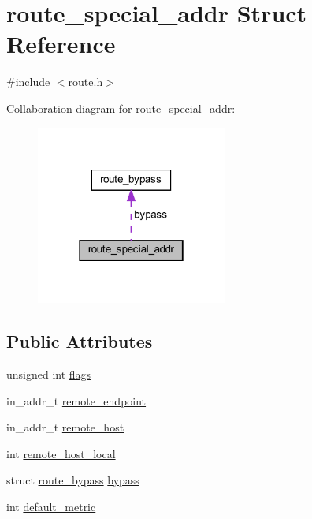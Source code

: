 \hypertarget{structroute__special__addr}{}\section{route\+\_\+special\+\_\+addr Struct Reference}
\label{structroute__special__addr}


{\ttfamily \#include $<$route.\+h$>$}



Collaboration diagram for route\+\_\+special\+\_\+addr\+:
\nopagebreak
\begin{figure}[H]
\begin{center}
\leavevmode
\includegraphics[width=178pt]{structroute__special__addr__coll__graph}
\end{center}
\end{figure}
\subsection*{Public Attributes}
\begin{DoxyCompactItemize}
\item 
unsigned int \hyperlink{structroute__special__addr_a481f8fbd69fd0bde3bc759962a694b3a}{flags}
\item 
in\+\_\+addr\+\_\+t \hyperlink{structroute__special__addr_aefc0db034c6d31840081075e4ee62098}{remote\+\_\+endpoint}
\item 
in\+\_\+addr\+\_\+t \hyperlink{structroute__special__addr_a38a9460b7b2499bb5fd58215639ae59d}{remote\+\_\+host}
\item 
int \hyperlink{structroute__special__addr_af88e550cc124331aafbdc4322db7fce0}{remote\+\_\+host\+\_\+local}
\item 
struct \hyperlink{structroute__bypass}{route\+\_\+bypass} \hyperlink{structroute__special__addr_a480dd8d898dbf3474fe5a88c771508f5}{bypass}
\item 
int \hyperlink{structroute__special__addr_a4b11eb7a3da6fbff125b3abc0761719d}{default\+\_\+metric}
\end{DoxyCompactItemize}


